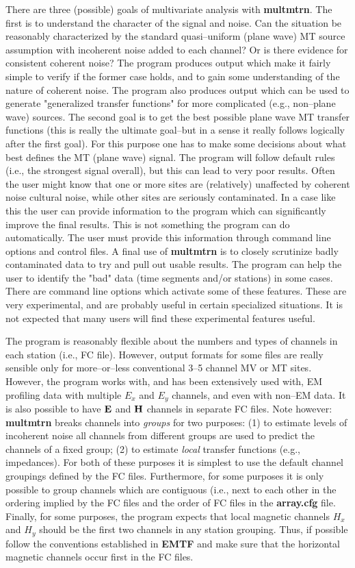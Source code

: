 There are three (possible) goals of multivariate analysis with 
{\bf multmtrn}.  The first is
to understand the character of the signal and noise.  Can the situation be
reasonably characterized by the standard quasi--uniform (plane wave) MT source
assumption with incoherent noise added to each channel?  Or is there evidence
for consistent coherent noise?  The program produces output which make it
fairly simple to verify if the former case holds, and to gain some understanding
of the nature of coherent noise.   The program also produces
output which can be used to generate "generalized transfer functions"
for more complicated (e.g., non--plane wave) sources.
The second goal is to get the best possible plane wave MT transfer functions
(this is really the ultimate goal--but in a sense it really follows logically
after the first goal).  For this purpose one has to make some decisions about
what best defines the MT (plane wave) signal.  The program will follow default
rules (i.e., the strongest signal overall), but this can lead to very poor results.
Often the user might know that one or more sites are (relatively) unaffected
by coherent noise cultural noise, while other sites are seriously contaminated.
In a case like this the user can provide information to the program
which can significantly improve the final results.  This is not something the
program can do automatically.  The user must provide this information through
command line options and control files.
A final use of {\bf multmtrn} is to
closely scrutinize badly contaminated data to try and pull out usable results.
The program can help the user to identify the "bad" data (time segments and/or
stations) in some cases.  There are command line 
options which activate some of these features.  These are very experimental,
and are probably useful in certain specialized situations.  It is not expected
that many users will find these experimental features useful.

The program
is reasonably flexible about the numbers and types of channels in each
station (i.e., FC file).  However, output formats for some files are really
sensible only for more--or--less conventional 3--5 channel MV or MT sites.
However, the program works with, and has been extensively used with, EM profiling
data with multiple $E_x$ and $E_y$ channels, and even with non--EM data.
It is also possible to have $\bf E$ and $\bf H$ channels in separate FC files.
Note however:
{\bf multmtrn} breaks channels into {\it groups} for two purposes: (1) to
estimate levels of incoherent noise all channels from different groups
are used to predict the channels of a fixed group; (2) to estimate {\it local}
transfer functions (e.g., impedances).  For both of these purposes it is simplest
to use the default channel groupings defined by the FC files.  Furthermore,
for some purposes it is
only possible to group channels which are contiguous (i.e., next
to each other in the ordering implied by the FC files and the order of FC
files in the {\bf array.cfg} file.  Finally, for some purposes, the program
expects that local magnetic channels $H_x$ and $H_y$ should be the first two
channels in any station grouping.  Thus, if possible follow the conventions 
established in {\bf EMTF} and make sure that the horizontal magnetic channels 
occur first in the FC files.

